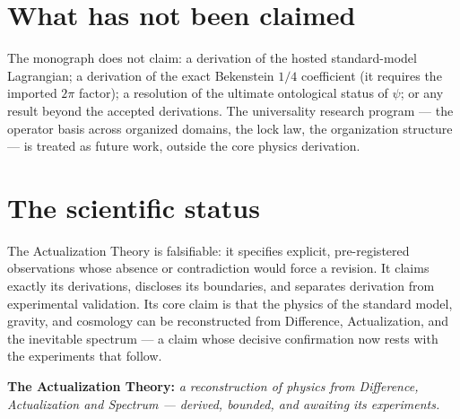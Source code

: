 \section*{What has not been claimed}

The monograph does not claim: a derivation of the hosted standard-model Lagrangian; a
derivation of the exact Bekenstein $1/4$ coefficient (it requires the imported $2\pi$
factor); a resolution of the ultimate ontological status of $\psi$; or any result beyond
the accepted derivations. The universality research program --- the operator basis across
organized domains, the lock law, the organization structure --- is treated as future work,
outside the core physics derivation.

\section*{The scientific status}

The Actualization Theory is falsifiable: it specifies explicit, pre-registered observations
whose absence or contradiction would force a revision. It claims exactly its derivations,
discloses its boundaries, and separates derivation from experimental validation. Its core
claim is that the physics of the standard model, gravity, and cosmology can be reconstructed
from Difference, Actualization, and the inevitable spectrum --- a claim whose decisive
confirmation now rests with the experiments that follow.

\vspace{1em}
\noindent\textbf{The Actualization Theory:}
\textit{a reconstruction of physics from Difference, Actualization and Spectrum ---
derived, bounded, and awaiting its experiments.}
